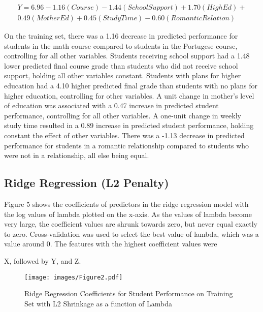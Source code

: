 \documentclass[sigconf]{acmart}
\begin{document}

\begin{equation*}
 \begin{aligned}
  Y = 6.96 - 1.16(Course) - 1.44(SchoolSupport) + 1.70(HighEd) + \\
  0.49(MotherEd) + 0.45(StudyTime) - 0.60(RomanticRelation)
 \end{aligned}
\end{equation*}

On the training set, there was a 1.16 decrease in predicted performance 
for students in the math course compared to students in the Portugese course, 
controlling for all other variables. Students receiving school support had 
a 1.48 lower predicted final course grade than students who did not receive 
school support, holding all other variables constant. Students with plans for
higher education had a 4.10 higher predicted final grade than students with 
no plans for higher education, controlling for other variables. A unit change 
in mother's level of education was associated with a 0.47 increase in predicted 
student performance, controlling for all other variables. A one-unit change in 
weekly study time resulted in a 0.89 increase in predicted student performance, 
holding constant the effect of other variables. There was a -1.13 decrease in 
predicted performance for students in a romantic relationship compared to 
students who were not in a relationship, all else being equal. 


\subsection{Ridge Regression (L2 Penalty)}

Figure 5 shows the coefficients of predictors in the ridge regression model 
with the log values of lambda plotted on the x-axis. As the values of lambda 
become very large, the coefficient values are shrunk towards zero, but 
never equal exactly to zero. Cross-validation was used to select the best 
value of lambda, which was a value around 0. The features with the highest 
coefficient values were 

X, followed by Y, and Z. 

\begin{figure}[!ht]
  \centering\texttt{[image: images/Figure2.pdf]}
  \caption{Ridge Regression Coefficients for Student Performance on Training Set
  with L2 Shrinkage as a function of Lambda}
  \label{f:Figure2}
\end{figure}
\end{document}
